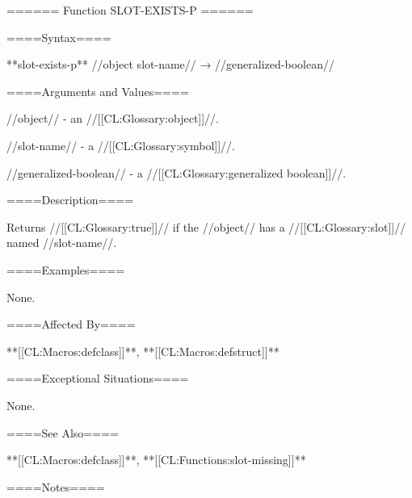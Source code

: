 ====== Function SLOT-EXISTS-P ======

====Syntax====

**{slot-exists-p}** //object slot-name// → //generalized-boolean//

====Arguments and Values====


//object// - an //[[CL:Glossary:object]]//.


//slot-name// - a //[[CL:Glossary:symbol]]//.

//generalized-boolean// - a //[[CL:Glossary:generalized boolean]]//.

====Description====



Returns //[[CL:Glossary:true]]// if the //object// has a //[[CL:Glossary:slot]]// named //slot-name//.

====Examples====

None.

====Affected By====

**[[CL:Macros:defclass]]**, **[[CL:Macros:defstruct]]**

====Exceptional Situations====

None.

====See Also====

**[[CL:Macros:defclass]]**, **[[CL:Functions:slot-missing]]**

====Notes====




